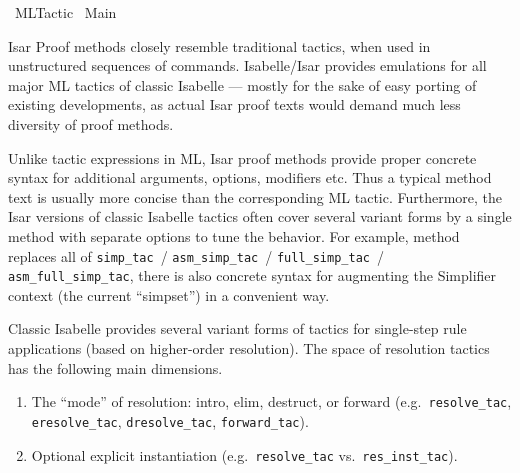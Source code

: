 %
\begin{isabellebody}%
\def\isabellecontext{ML{\isacharunderscore}Tactic}%
%
\isadelimtheory
\isanewline
\isanewline
%
\endisadelimtheory
%
\isatagtheory
{}\isamarkupfalse%
\ ML{\isacharunderscore}Tactic\isanewline
{}\ Main\isanewline
{}%
\endisatagtheory
{\isafoldtheory}%
%
\isadelimtheory
%
\endisadelimtheory
%
\isamarkuptrue%
%
\begin{isamarkuptext}%
Isar Proof methods closely resemble traditional tactics, when used
  in unstructured sequences of \hyperlink{command.apply}{\mbox{}} commands.
  Isabelle/Isar provides emulations for all major ML tactics of
  classic Isabelle --- mostly for the sake of easy porting of existing
  developments, as actual Isar proof texts would demand much less
  diversity of proof methods.

  Unlike tactic expressions in ML, Isar proof methods provide proper
  concrete syntax for additional arguments, options, modifiers etc.
  Thus a typical method text is usually more concise than the
  corresponding ML tactic.  Furthermore, the Isar versions of classic
  Isabelle tactics often cover several variant forms by a single
  method with separate options to tune the behavior.  For example,
  method \hyperlink{method.simp}{\mbox{}} replaces all of \verb|simp_tac|~/ \verb|asm_simp_tac|~/ \verb|full_simp_tac|~/ \verb|asm_full_simp_tac|, there
  is also concrete syntax for augmenting the Simplifier context (the
  current ``simpset'') in a convenient way.%
\end{isamarkuptext}%
\isamarkuptrue%
%
\isamarkuptrue%
%
\begin{isamarkuptext}%
Classic Isabelle provides several variant forms of tactics for
  single-step rule applications (based on higher-order resolution).
  The space of resolution tactics has the following main dimensions.

  \begin{enumerate}

  \item The ``mode'' of resolution: intro, elim, destruct, or forward
  (e.g.\ \verb|resolve_tac|, \verb|eresolve_tac|, \verb|dresolve_tac|,
  \verb|forward_tac|).

  \item Optional explicit instantiation (e.g.\ \verb|resolve_tac| vs.\
  \verb|res_inst_tac|).


\end{enumerate}
\end{isamarkuptext}
\end{isabellebody}

